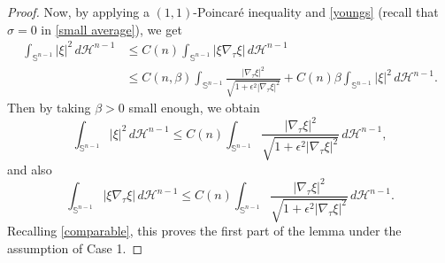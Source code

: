 \documentclass[10pt,a4paper]{amsart}
\def\bz{\beta}
\def\ez{\epsilon}
\def\sz{\sigma}
\begin{document}
\begin{proof}
Now, by applying a $(1,1)$-Poincar\'e inequality and \eqref{youngs} (recall that $\sz=0$ in \eqref{small average}), we get
\begin{align*}
\int_{\mathbb S^{n-1}} |\xi|^2 \,d\mathscr H^{n-1}& \leq  C(n) \int_{\mathbb S^{n-1}} |\xi \nabla_\tau \xi| \,d\mathscr H^{n-1}\\
& \leq  C(n,\bz) \int_{\mathbb S^{n-1}}  \frac{|\nabla_\tau  \xi|^2}{\sqrt{1+\ez^2|\nabla_\tau \xi|^2}}   + C(n)\bz \int_{\mathbb S^{n-1}}   |\xi|^2 \,d\mathscr H^{n-1}.
\end{align*}
Then by taking $\bz>0$ small enough, we obtain
\begin{equation}\label{xi2 L2}
 \int_{\mathbb S^{n-1}} |\xi|^2 \,d\mathscr H^{n-1} \le  C(n)  \int_{\mathbb S^{n-1}} \frac{|\nabla_\tau  \xi|^2}{\sqrt{1+\ez^2|\nabla_\tau \xi|^2}} \,d\mathscr H^{n-1},
\end{equation}
and also
\begin{equation}\label{xi2 W11}
    \int_{\mathbb S^{n-1}} |\xi \nabla_\tau \xi| \,d\mathscr H^{n-1}\le  C(n)  \int_{\mathbb S^{n-1}} \frac{|\nabla_\tau  \xi|^2}{\sqrt{1+\ez^2|\nabla_\tau \xi|^2}} \,d\mathscr H^{n-1}.
\end{equation}
Recalling \eqref{comparable}, this proves the first part of the lemma under the assumption of Case 1.


\end{proof}
\end{document}
